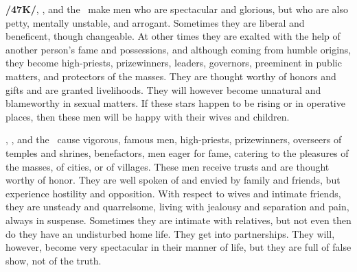 \textbf{/47K/}\Jupiter, \Venus, and the \Sun\, make men who are spectacular and glorious, but who are also petty, mentally unstable, and arrogant. Sometimes they are liberal and beneficent, though changeable. At other times they are exalted with the help of another person’s fame and possessions, and although coming from humble origins, they become high-priests, prizewinners, leaders, governors, preeminent in public matters, and protectors of the masses. They are thought worthy of honors and gifts and are granted livelihoods. They will however become unnatural and blameworthy in sexual matters. If these stars happen to be rising or in operative places, then these men will be happy with their wives and children.

\Jupiter, \Venus, and the \Moon\, cause vigorous, famous men, high-priests, prizewinners, overseers of temples and shrines, benefactors, men eager for fame, catering to the pleasures of the masses, of cities, or of villages. These men receive trusts and are thought worthy of honor. They are well spoken of and envied by family and friends, but experience hostility and opposition. With respect to wives and intimate friends, they are unsteady and quarrelsome, living with jealousy and separation and pain, always in suspense. Sometimes they are intimate with relatives, but not even then do they have an undisturbed home life. They get into partnerships. They will, however, become very spectacular in their manner of life, but they are full of false show, not of the truth.

\secbr
{}

